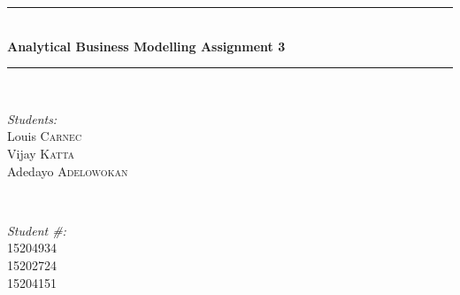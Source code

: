 \documentclass[a4paper,11pt]{article}
\begin{document}
\begin{titlepage}

\newcommand{\HRule}{\rule{\linewidth}{0.5mm}} %

\center %
 


\HRule \\[0.4cm]
{ \huge \bfseries Analytical Business Modelling Assignment 3}\\[0.4cm] %
\HRule \\[1.5cm]
 

\begin{minipage}{0.4\textwidth}
\begin{flushleft} \large
\emph{Students:}\\
Louis \textsc{Carnec}\\ %
Vijay \textsc{Katta}\\ %
Adedayo \textsc{Adelowokan}
\end{flushleft}
\end{minipage}
~
\begin{minipage}{0.4\textwidth}
\begin{flushright} \large
\emph{Student \#:} \\
15204934\\ %
15202724\\
15204151
\end{flushright}
\end{minipage}\\[4cm]




\end{titlepage}
\end{document}
